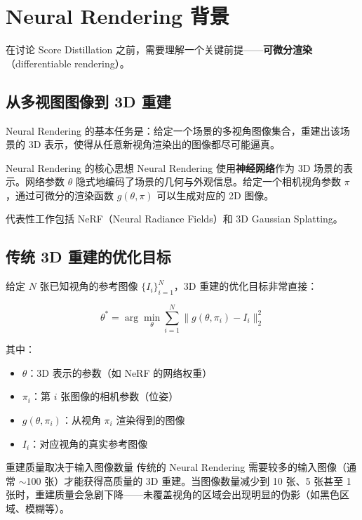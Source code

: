 \section{Neural Rendering 背景}

在讨论 Score Distillation 之前，需要理解一个关键前提——\textbf{可微分渲染}（differentiable rendering）。

\subsection{从多视图图像到 3D 重建}

Neural Rendering 的基本任务是：给定一个场景的多视角图像集合，重建出该场景的 3D 表示，使得从任意新视角渲染出的图像都尽可能逼真。

\begin{knowledgebox}{Neural Rendering 的核心思想}
Neural Rendering 使用\textbf{神经网络}作为 3D 场景的表示。网络参数 $\theta$ 隐式地编码了场景的几何与外观信息。给定一个相机视角参数 $\pi$，通过可微分的渲染函数 $g(\theta, \pi)$ 可以生成对应的 2D 图像。

代表性工作包括 NeRF（Neural Radiance Fields）和 3D Gaussian Splatting。
\end{knowledgebox}

\subsection{传统 3D 重建的优化目标}

给定 $N$ 张已知视角的参考图像 $\{I_i\}_{i=1}^{N}$，3D 重建的优化目标非常直接：

$$
\theta^* = \arg\min_{\theta} \sum_{i=1}^{N} \| g(\theta, \pi_i) - I_i \|_2^2
$$

其中：
\begin{itemize}
    \item $\theta$：3D 表示的参数（如 NeRF 的网络权重）
    \item $\pi_i$：第 $i$ 张图像的相机参数（位姿）
    \item $g(\theta, \pi_i)$：从视角 $\pi_i$ 渲染得到的图像
    \item $I_i$：对应视角的真实参考图像
\end{itemize}

\begin{warningbox}{重建质量取决于输入图像数量}
传统的 Neural Rendering 需要较多的输入图像（通常 $\sim$100 张）才能获得高质量的 3D 重建。当图像数量减少到 10 张、5 张甚至 1 张时，重建质量会急剧下降——未覆盖视角的区域会出现明显的伪影（如黑色区域、模糊等）。
\end{warningbox}

